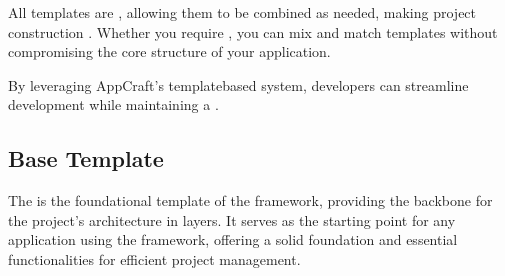 \documentclass[letterpaper,10pt,english]{sphinxhowto}
\begin{document}
\sphinxAtStartPar
All templates are , allowing them to be combined as needed, making project construction . Whether you require , you can mix and match templates without compromising the core structure of your application.

\sphinxAtStartPar
By leveraging AppCraft’s template\sphinxhyphen{}based system, developers can streamline development while maintaining a .

\sphinxstepscope


\subsection{Base Template}
\label{\detokenize{templates/base/index:base-template}}\label{\detokenize{templates/base/index::doc}}
\sphinxAtStartPar
The  is the foundational template of the framework, providing the backbone for the project’s architecture in layers. It serves as the starting point for any application using the framework, offering a solid foundation and essential functionalities for efficient project management.
\end{document}
